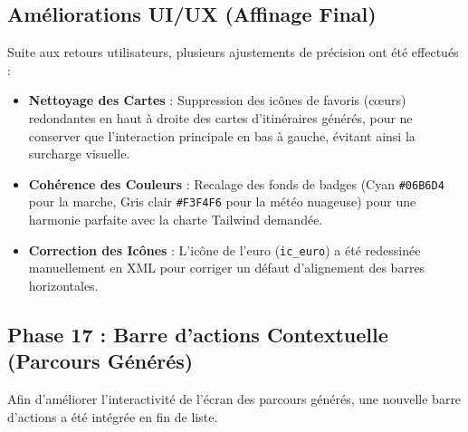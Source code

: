 \documentclass{article}
\begin{document}
\subsection{Améliorations UI/UX (Affinage Final)}
Suite aux retours utilisateurs, plusieurs ajustements de précision ont été effectués :
\begin{itemize}
    \item \textbf{Nettoyage des Cartes} : Suppression des icônes de favoris (cœurs) redondantes en haut à droite des cartes d'itinéraires générés, pour ne conserver que l'interaction principale en bas à gauche, évitant ainsi la surcharge visuelle.
    \item \textbf{Cohérence des Couleurs} : Recalage des fonds de badges (Cyan \texttt{\#06B6D4} pour la marche, Gris clair \texttt{\#F3F4F6} pour la météo nuageuse) pour une harmonie parfaite avec la charte Tailwind demandée.
    \item \textbf{Correction des Icônes} : L'icône de l'euro (\texttt{ic\_euro}) a été redessinée manuellement en XML pour corriger un défaut d'alignement des barres horizontales.
\end{itemize}

\subsection{Phase 17 : Barre d'actions Contextuelle (Parcours Générés)}
Afin d'améliorer l'interactivité de l'écran des parcours générés, une nouvelle barre d'actions a été intégrée en fin de liste.
\end{document}
